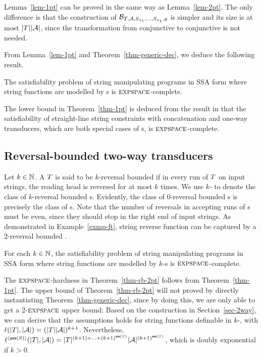 Lemma~\ref{lem-1pt} can be proved in the same way as Lemma~\ref{lem-2pt}. The only difference is that the construction of $\mathcal{B}_{T, \mathcal{A}, S_{x_1}, \ldots, S_{x_k}, q}$ is simpler and its size is at most $|T| |\mathcal{A}|$, since the transformation from  conjunctive \FFA{} to conjunctive \FA{} is not needed.

From Lemma~\ref{lem-1pt} and Theorem~\ref{thm-generic-dec}, we deduce the following result.
%
\begin{theorem} \label{thm-1pt}
The satisfiability problem of string manipulating programs in SSA form where string functions are modelled by \PT{}s is $\textsc{expspace}$-complete. 
\end{theorem}

The lower bound in Theorem~\ref{thm-1pt} is deduced from the result in \cite{LB16} that the satisfiability of straight-line string constraints with concatenation and one-way transducers, which are both special cases of \PT{}s, is $\textsc{expspace}$-complete.

\subsection{Reversal-bounded two-way transducers}

Let $k \in \mathbb{N}$. A \PPT{} $T$ is said  to be $k$-reversal bounded if in every run of $T$ on input strings, the reading head is reversed for at most $k$ times. We use  $k$-\RBPPT{} to denote the class of $k$-reversal bounded \PPT{}s. 
Evidently, the class of $0$-reversal bounded \PPT{}s is precisely the class of \PT{}s. Note that the number of reversals in accepting runs of \PPT{}s must be even, since they should stop in the right end of input strings.  As demonstrated in Example~\ref{exmp-ft}, string reverse function can be captured by a $2$-reversal bounded \PPT.


%
\begin{theorem} \label{thm-rb-2pt}
For each $k \in \mathbb{N}$, the satisfiability problem of string manipulating programs in SSA form where string functions are modelled by $k$-\RBPPT{}s is $\textsc{expspace}$-complete. 
\end{theorem}

The $\textsc{expspace}$-hardness in Theorem~\ref{thm-rb-2pt} follows from Theorem~\ref{thm-1pt}.
The upper bound of Theorem~\ref{thm-rb-2pt} will not proved by directly instantiating Theorem~\ref{thm-generic-dec}, since  by doing this, we are only able to get a 2-$\textsc{expspace}$ upper bound: Based on the construction in Section~\ref{sec-2way}, we can derive that the \prerec{} assumptions holds for string functions definable in $k$-\RBPPT, with $\ell(|T|, |\mathcal{A}|) = (|T||\mathcal{A}|)^{k+1}$. Nevertheless, $\ell^{\langle \mathsf{ass}(S)\rangle}(|T|, |\mathcal{A}|) = |T|^{(k+1) + \ldots + (k+1)^{\mathsf{ass}(S)}} |\mathcal{A}|^{(k+1)^{\mathsf{ass}(S)}}$, which is doubly exponential if $k > 0$.

